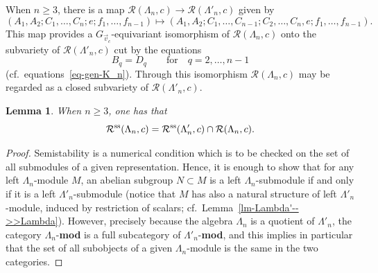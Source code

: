 \documentclass[pdftex]{sigma}
\numberwithin{equation}{section}
\newtheorem{Lemma}[Theorem]{Lemma}
\begin{document}
When $n\geq 3$, there is a map $\mathcal{R}(\Lambda_{n}, c) \longrightarrow \mathcal{R}(\Lambda'_{n}, c)$ given by
\begin{equation*}
(A_1,A_2;C_1,\dots,C_n;e;f_1,\dots,f_{n-1}) \mapsto
(A_1,A_2;C_1,\dots,C_{n-1};C_{2},\dots,C_{n},e;f_1,\dots,f_{n-1}) .
\end{equation*}
This map provides a $G_{\vec{v}_{c}}$-equivariant isomorphism of $\mathcal{R}(\Lambda_{n}, c)$ onto the subvariety of $\mathcal{R}(\Lambda'_{n}, c)$ cut by the equations
\begin{equation*}
B_{q}=D_{q}\qquad\text{for}\quad q=2,\dots,n-1
\end{equation*}
(cf.\ equations~\eqref{eq-gen-K_n}). Through this isomorphism $\mathcal{R}(\Lambda_{n}, c)$ may be regarded as a closed subvariety of $\mathcal{R}(\Lambda'_{n}, c)$.
\begin{Lemma}\label{lm-R_n(c)-in-R'_n(c)}
When $n\geq 3$, one has that
\begin{equation*}
\mathcal{R}^{\rm ss}(\Lambda_{n}, c) =\mathcal{R}^{\rm ss}(\Lambda'_{n}, c) \cap \mathcal{R}(\Lambda_{n}, c) .
\end{equation*}
\end{Lemma}
\begin{proof}Semistability is a numerical condition which is to be checked on the set of all submodules of a given representation. Hence, it is enough to show that for any left $\Lambda_{n}$-module $M$, an abelian subgroup $N\subset M$ is a left $\Lambda_{n}$-submodule if and only if it is a left $\Lambda'_{n}$-submodule (notice that $M$ has also a natural structure of left $\Lambda'_{n}$-module, induced by restriction of scalars; cf.\ Lemma~\ref{lm-Lambda'-->>Lambda}).
However, precisely because the algebra $\Lambda_n$ is a quotient of $\Lambda'_n$,
the category $\Lambda_{n}$-{\bf mod} is a full subcategory of $\Lambda'_{n}$-{\bf mod}, and this implies in particular that the set of all subobjects of a given $\Lambda_n$-module is the same in the two categories.
\end{proof}
\end{document}
